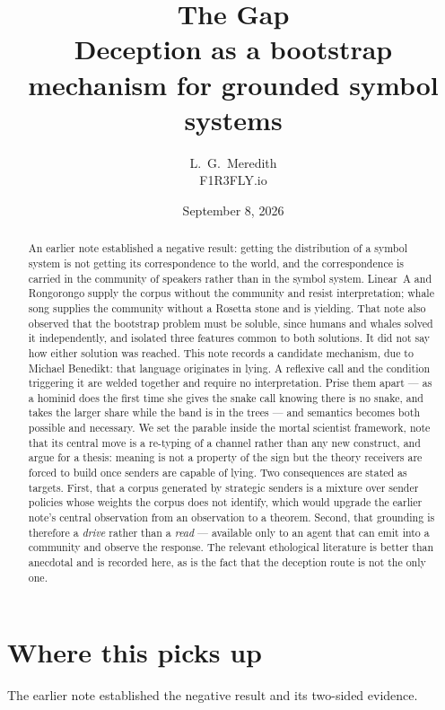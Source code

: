 \documentclass[11pt]{article}
\title{\bfseries The Gap\\[.35em]
\large Deception as a bootstrap mechanism for grounded symbol systems}
\author{L.\ G.\ Meredith\\ \small F1R3FLY.io}
\date{September 8, 2026}
\theoremstyle{plain}
\theoremstyle{definition}
\begin{document}
\maketitle

\begin{abstract}
An earlier note established a negative result: getting the distribution of a symbol system is not
getting its correspondence to the world, and the correspondence is carried in the community of
speakers rather than in the symbol system. Linear~A and Rongorongo supply the corpus without the
community and resist interpretation; whale song supplies the community without a Rosetta stone and is
yielding. That note also observed that the bootstrap problem must be soluble, since humans and whales
solved it independently, and isolated three features common to both solutions. It did not say how
either solution was reached. This note records a candidate mechanism, due to Michael Benedikt: that
language originates in lying. A reflexive call and the condition triggering it are welded together and
require no interpretation. Prise them apart --- as a hominid does the first time she gives the snake
call knowing there is no snake, and takes the larger share while the band is in the trees --- and
semantics becomes both possible and necessary. We set the parable inside the mortal scientist
framework, note that its central move is a re-typing of a channel rather than any new construct, and
argue for a thesis: meaning is not a property of the sign but the theory receivers are forced to build
once senders are capable of lying. Two consequences are stated as targets. First, that a corpus
generated by strategic senders is a mixture over sender policies whose weights the corpus does not
identify, which would upgrade the earlier note's central observation from an observation to a theorem.
Second, that grounding is therefore a \emph{drive} rather than a \emph{read} --- available only to an
agent that can emit into a community and observe the response. The relevant ethological literature is
better than anecdotal and is recorded here, as is the fact that the deception route is not the only
one.
\end{abstract}

\section{Where this picks up}
\label{sec:pickup}

The earlier note established the negative result and its two-sided evidence.
\end{document}
